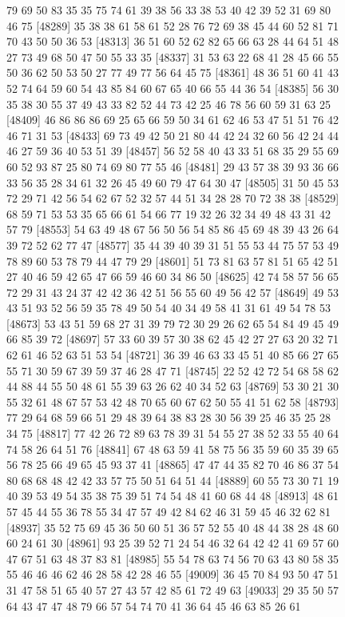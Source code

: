 \documentclass{article}
\begin{document}
\begin{figure}[H]
\begin{Schunk}
\begin{Soutput}
[48265] 79 69 50 83 35 35 75 74 61 39 38 56 33 38 53 40 42 39 52 31 69 80 46 75
[48289] 35 38 38 61 58 61 52 28 76 72 69 38 45 44 60 52 81 71 70 43 50 50 36 53
[48313] 36 51 60 52 62 82 65 66 63 28 44 64 51 48 27 73 49 68 50 47 50 55 33 35
[48337] 31 53 63 22 68 41 28 45 66 55 50 36 62 50 53 50 27 77 49 77 56 64 45 75
[48361] 48 36 51 60 41 43 52 74 64 59 60 54 43 85 84 60 67 65 40 66 55 44 36 54
[48385] 56 30 35 38 30 55 37 49 43 33 82 52 44 73 42 25 46 78 56 60 59 31 63 25
[48409] 46 86 86 86 69 25 65 66 59 50 34 61 62 46 53 47 51 51 76 42 46 71 31 53
[48433] 69 73 49 42 50 21 80 44 42 24 32 60 56 42 24 44 46 27 59 36 40 53 51 39
[48457] 56 52 58 40 43 33 51 68 35 29 55 69 60 52 93 87 25 80 74 69 80 77 55 46
[48481] 29 43 57 38 39 93 36 66 33 56 35 28 34 61 32 26 45 49 60 79 47 64 30 47
[48505] 31 50 45 53 72 29 71 42 56 54 62 67 52 32 57 44 51 34 28 28 70 72 38 38
[48529] 68 59 71 53 53 35 65 66 61 54 66 77 19 32 26 32 34 49 48 43 31 42 57 79
[48553] 54 63 49 48 67 56 50 56 54 85 86 45 69 48 39 43 26 64 39 72 52 62 77 47
[48577] 35 44 39 40 39 31 51 55 53 44 75 57 53 49 78 89 60 53 78 79 44 47 79 29
[48601] 51 73 81 63 57 81 51 65 42 51 27 40 46 59 42 65 47 66 59 46 60 34 86 50
[48625] 42 74 58 57 56 65 72 29 31 43 24 37 42 42 36 42 51 56 55 60 49 56 42 57
[48649] 49 53 43 51 93 52 56 59 35 78 49 50 54 40 34 49 58 41 31 61 49 54 78 53
[48673] 53 43 51 59 68 27 31 39 79 72 30 29 26 62 65 54 84 49 45 49 66 85 39 72
[48697] 57 33 60 39 57 30 38 62 45 42 27 27 63 20 32 71 62 61 46 52 63 51 53 54
[48721] 36 39 46 63 33 45 51 40 85 66 27 65 55 71 30 59 67 39 59 37 46 28 47 71
[48745] 22 52 42 72 54 68 58 62 44 88 44 55 50 48 61 55 39 63 26 62 40 34 52 63
[48769] 53 30 21 30 55 32 61 48 67 57 53 42 48 70 65 60 67 62 50 55 41 51 62 58
[48793] 77 29 64 68 59 66 51 29 48 39 64 38 83 28 30 56 39 25 46 35 25 28 34 75
[48817] 77 42 26 72 89 63 78 39 31 54 55 27 38 52 33 55 40 64 74 58 26 64 51 76
[48841] 67 48 63 59 41 58 75 56 35 59 60 35 39 65 56 78 25 66 49 65 45 93 37 41
[48865] 47 47 44 35 82 70 46 86 37 54 80 68 68 48 42 42 33 57 75 50 51 64 51 44
[48889] 60 55 73 30 71 19 40 39 53 49 54 35 38 75 39 51 74 54 48 41 60 68 44 48
[48913] 48 61 57 45 44 55 36 78 55 34 47 57 49 42 84 62 46 31 59 45 46 32 62 81
[48937] 35 52 75 69 45 36 50 60 51 36 57 52 55 40 48 44 38 28 48 60 60 24 61 30
[48961] 93 25 39 52 71 24 54 46 32 64 42 42 41 69 57 60 47 67 51 63 48 37 83 81
[48985] 55 54 78 63 74 56 70 63 43 80 58 35 55 46 46 46 62 46 28 58 42 28 46 55
[49009] 36 45 70 84 93 50 47 51 31 47 58 51 65 40 57 27 43 57 42 85 61 72 49 63
[49033] 29 35 50 57 64 43 47 47 48 79 66 57 54 74 70 41 36 64 45 46 63 85 26 61

\end{Soutput}
\end{Schunk}
\end{figure}
\end{document}
